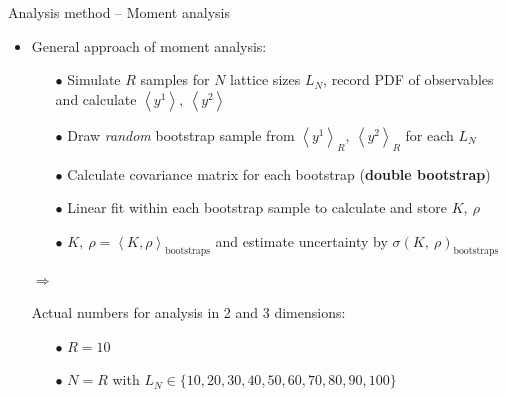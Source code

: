 \documentclass[xcolor=dvipsnames]{beamer}
\newcommand{\myitemsep}{\setlength\itemsep{0.33cm}}
\newcommand{\mysubitemsep}{\setlength\itemsep{0.22cm}}
\begin{document}
    \begin{frame}[t]{Analysis method -- Moment analysis}
        \begin{itemize}
            \myitemsep
            \item {General approach of moment analysis:
                \begin{itemize}
                    \mysubitemsep
                    \item[$\bullet$] Simulate $R$ samples for $N$ lattice sizes $L_N$, record PDF of observables and
                                     calculate $\left\langle y^1 \right\rangle,\ \left\langle y^2 \right\rangle$
                    \item[$\bullet$] Draw \textit{random} bootstrap sample from $\left\langle y^1 \right\rangle_R,
                                     \ \left\langle y^2 \right\rangle_R$ for each $L_N$
                    \item[$\bullet$] Calculate covariance matrix for each bootstrap (\textbf{double bootstrap})
                    \item[$\bullet$] Linear fit within each bootstrap sample to calculate and store $K,\ \rho$
                    \item[$\bullet$] $K,\ \rho = \left\langle K, \rho \right\rangle_{\mathrm{bootstraps}}$ and estimate
                                     uncertainty by $\sigma (K,\ \rho)_{\mathrm{bootstraps}}$
                \end{itemize}
            }
            \item[$\Rightarrow$] {Actual numbers for analysis in 2 and 3 dimensions:
                \begin{itemize}
                    \mysubitemsep
                    \item[$\bullet$] $R = 10$
                    \item[$\bullet$] $N = R$ with $L_N \in \{10, 20, 30, 40, 50, 60, 70, 80, 90, 100\}$
                \end{itemize}
            }
        \end{itemize}
    \end{frame}
    
\end{document}
